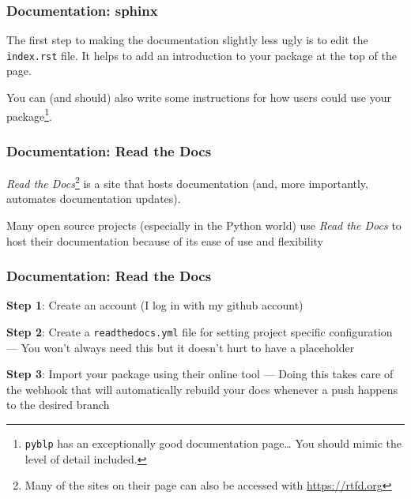 \documentclass[10pt]{beamer}
\begin{document}
  \begin{frame} \frametitle{Documentation: sphinx}

    The first step to making the documentation slightly less ugly is to edit the
    \texttt{index.rst} file. It helps to add an introduction to your package at the top
    of the page.

    \vspace{0.25cm}

    You can (and should) also write some instructions for how users could use your
    package\footnote{\texttt{pyblp} has an exceptionally good documentation page\dots
    You should mimic the level of detail included.}.

  \end{frame}

  \begin{frame} \frametitle{Documentation: Read the Docs}

    \textit{Read the Docs}\footnote{Many of the sites on their page can also be accessed with
    \href{https://www.urbandictionary.com/define.php?term=RTFD}{https://rtfd.org}} is a
    site that hosts documentation (and, more importantly, automates documentation
    updates).

    \vspace{0.25cm}

    Many open source projects (especially in the Python world) use \textit{Read the Docs} to host
    their documentation because of its ease of use and flexibility

  \end{frame}

  \begin{frame} \frametitle{Documentation: Read the Docs}

    \textbf{Step 1}: Create an account (I log in with my github account)

    \vspace{0.25cm}

    \textbf{Step 2}: Create a \texttt{readthedocs.yml} file for setting project
    specific configuration --- You won't always need this but it doesn't hurt to have a
    placeholder

    \vspace{0.25cm}

    \textbf{Step 3}: Import your package using their online tool --- Doing this takes
    care of the webhook that will automatically rebuild your docs whenever a push happens
    to the desired branch

  \end{frame}
\end{document}
